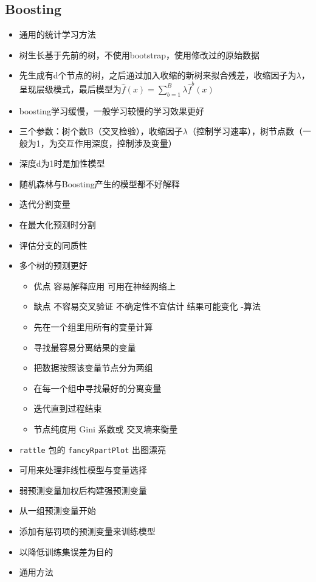 \documentclass[
]{book}
\providecommand{\tightlist}{%
  \setlength{\itemsep}{0pt}\setlength{\parskip}{0pt}}
\begin{document}
\hypertarget{boosting}{%
\subsection{Boosting}\label{boosting}}

\begin{itemize}
\item
  通用的统计学习方法
\item
  树生长基于先前的树，不使用bootstrap，使用修改过的原始数据
\item
  先生成有d个节点的树，之后通过加入收缩的新树来拟合残差，收缩因子为\(\lambda\)，呈现层级模式，最后模型为\(\hat f(x) = \sum_{b = 1}^B \lambda \hat f^b(x)\)
\item
  boosting学习缓慢，一般学习较慢的学习效果更好
\item
  三个参数：树个数B（交叉检验），收缩因子\(\lambda\)（控制学习速率），树节点数（一般为1，为交互作用深度，控制涉及变量）
\item
  深度d为1时是加性模型
\item
  随机森林与Boosting产生的模型都不好解释
\item
  迭代分割变量
\item
  在最大化预测时分割
\item
  评估分支的同质性
\item
  多个树的预测更好

  \begin{itemize}
  \tightlist
  \item
    优点 容易解释应用 可用在神经网络上
  \item
    缺点 不容易交叉验证 不确定性不宜估计 结果可能变化
    -算法
  \item
    先在一个组里用所有的变量计算
  \item
    寻找最容易分离结果的变量
  \item
    把数据按照该变量节点分为两组
  \item
    在每一个组中寻找最好的分离变量
  \item
    迭代直到过程结束\\
  \item
    节点纯度用 Gini 系数或 交叉墒来衡量
  \end{itemize}
\item
  \texttt{rattle} 包的 \texttt{fancyRpartPlot} 出图漂亮
\item
  可用来处理非线性模型与变量选择
\item
  弱预测变量加权后构建强预测变量
\item
  从一组预测变量开始
\item
  添加有惩罚项的预测变量来训练模型
\item
  以降低训练集误差为目的
\item
  通用方法
\end{itemize}
\end{document}
